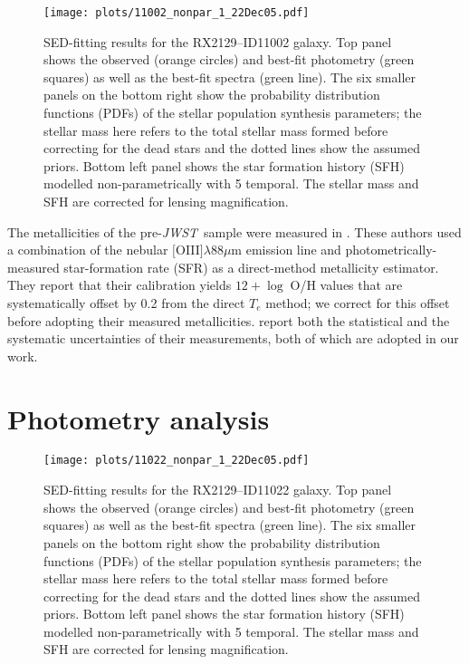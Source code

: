 \documentclass[twocolumn]{aastex631}
\newcommand{\jwst}{{\em JWST}}
\begin{document}
\begin{figure*}
    \centering
    \texttt{[image: plots/11002\_nonpar\_1\_22Dec05.pdf]}
    \caption{SED-fitting results for the RX2129--ID11002 galaxy. Top panel shows the observed (orange circles) and best-fit photometry (green squares) as well as the best-fit spectra (green line). The six smaller panels on the bottom right show the probability distribution functions (PDFs) of the stellar population synthesis parameters; the stellar mass here refers to the total stellar mass formed before correcting for the dead stars and the dotted lines show the assumed priors. Bottom left panel shows the star formation history (SFH) modelled non-parametrically with 5 temporal. The stellar mass and SFH are corrected for lensing magnification.}
    \label{fig: 11002}
\end{figure*}

The metallicities of the pre-\jwst\ sample were measured in \cite{jones+2020}. These authors used a combination of the nebular $[$O{\footnotesize\;III}$]\lambda88\mu$m emission line and photometrically-measured star-formation rate (SFR) as a direct-method metallicity estimator. They report that their calibration yields $12 + \log\;$O/H values that are systematically offset by 0.2 from the direct $T_e$ method; we correct for this offset before adopting their measured metallicities. \cite{jones+2020} report both the statistical and the systematic uncertainties of their measurements, both of which are adopted in our work. 


\section{Photometry analysis} \label{sec: photometry}

\begin{figure*}
    \centering
    \texttt{[image: plots/11022\_nonpar\_1\_22Dec05.pdf]}
    \caption{SED-fitting results for the RX2129--ID11022 galaxy. Top panel shows the observed (orange circles) and best-fit photometry (green squares) as well as the best-fit spectra (green line). The six smaller panels on the bottom right show the probability distribution functions (PDFs) of the stellar population synthesis parameters; the stellar mass here refers to the total stellar mass formed before correcting for the dead stars and the dotted lines show the assumed priors. Bottom left panel shows the star formation history (SFH) modelled non-parametrically with 5 temporal. The stellar mass and SFH are corrected for lensing magnification.}
    \label{fig: 11022}
\end{figure*}
\end{document}
